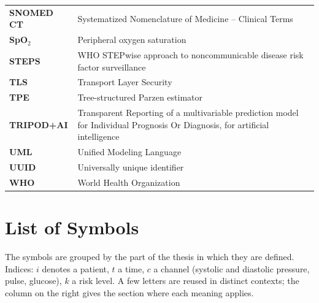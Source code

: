 {\begin{longtable}{@{}>{\bfseries}p{3.0cm} p{11.6cm}@{}}
SNOMED CT & Systematized Nomenclature of Medicine -- Clinical Terms \\
SpO$_2$ & Peripheral oxygen saturation \\
STEPS & WHO STEPwise approach to noncommunicable disease risk factor surveillance \\
TLS & Transport Layer Security \\
TPE & Tree-structured Parzen estimator \\
TRIPOD+AI & Transparent Reporting of a multivariable prediction model for Individual Prognosis Or Diagnosis, for artificial intelligence \\
UML & Unified Modeling Language \\
UUID & Universally unique identifier \\
WHO & World Health Organization \\
\end{longtable}
}

\cleardoublepage{}
\chapter*{List of Symbols}\label{app:symbols}

The symbols are grouped by the part of the thesis in which they are defined. Indices: $i$ denotes a patient, $t$ a time, $c$ a channel (systolic and diastolic pressure, pulse, glucose), $k$ a risk level. A few letters are reused in distinct contexts; the column on the right gives the section where each meaning applies.

